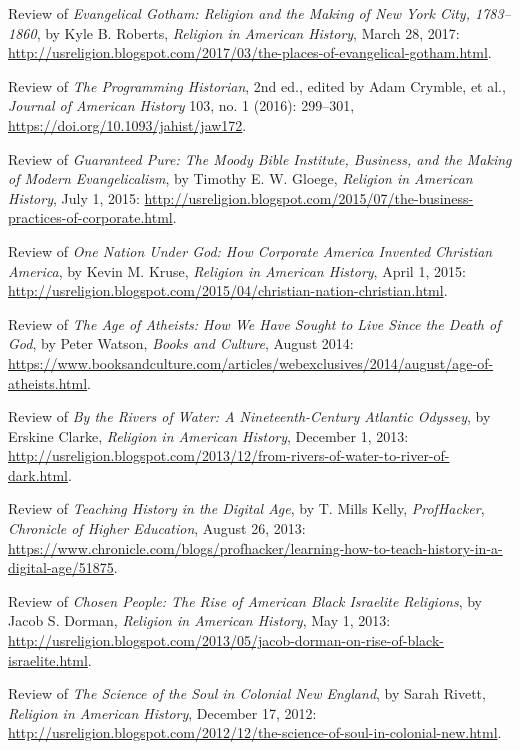 \documentclass[11pt]{article}
\begin{document}
Review of \emph{Evangelical Gotham: Religion and the Making of New York City, 
  1783--1860}, by Kyle B. Roberts, \emph{Religion in American History}, March 
28, 2017: 
\url{http://usreligion.blogspot.com/2017/03/the-places-of-evangelical-gotham.html}.

Review of \emph{The Programming Historian}, 2nd ed., edited by
Adam Crymble, et al., \emph{Journal of American History} 103, no. 1 (2016): 
299--301, \url{https://doi.org/10.1093/jahist/jaw172}.

Review of \emph{Guaranteed Pure: The Moody Bible Institute, Business, and the 
  Making of Modern Evangelicalism}, by Timothy E. W. Gloege, \emph{Religion in 
  American History}, July 1, 2015: 
  \url{http://usreligion.blogspot.com/2015/07/the-business-practices-of-corporate.html}.

Review of \emph{One Nation Under God: How Corporate America Invented Christian 
  America}, by Kevin M. Kruse, \emph{Religion in American History}, April 1, 
2015: 
\url{http://usreligion.blogspot.com/2015/04/christian-nation-christian.html}.


Review of \emph{The Age of Atheists: How We Have Sought to Live Since
  the Death of God}, by Peter Watson, \emph{Books and Culture}, August
2014: 
\url{https://www.booksandculture.com/articles/webexclusives/2014/august/age-of-atheists.html}.

Review of \emph{By the Rivers of Water: A Nineteenth-Century Atlantic
  Odyssey}, by Erskine Clarke, \emph{Religion in American History},
December 1, 2013: 
\url{http://usreligion.blogspot.com/2013/12/from-rivers-of-water-to-river-of-dark.html}.

Review of \emph{Teaching History in the Digital Age}, by T. Mills Kelly,
\emph{ProfHacker}, \emph{Chronicle of Higher Education}, August 26,
2013: 
\url{https://www.chronicle.com/blogs/profhacker/learning-how-to-teach-history-in-a-digital-age/51875}.

Review of \emph{Chosen People: The Rise of American Black Israelite
  Religions}, by Jacob S. Dorman, \emph{Religion in American History}, May
1, 2013: 
\url{http://usreligion.blogspot.com/2013/05/jacob-dorman-on-rise-of-black-israelite.html}.

Review of \emph{The Science of the Soul in Colonial New England}, by
Sarah Rivett, \emph{Religion in American History}, December 17, 2012: 
\url{http://usreligion.blogspot.com/2012/12/the-science-of-soul-in-colonial-new.html}.
\end{document}
